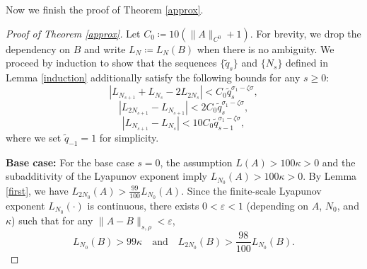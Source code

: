 \documentclass[reqno,12pt]{amsart}
\theoremstyle{plain}
\theoremstyle{definition}
\numberwithin{equation}{section}
\begin{document}
Now we finish the proof of Theorem \ref{approx}.
\begin{proof}[Proof of Theorem \ref{approx}]
Let $C_{0}\coloneq 10(\|A\|_{C^{0}}+1)$. For brevity, we drop the dependency on $B$ and write $L_{N}\coloneq L_{N}(B)$ when there is no ambiguity.
We proceed by induction to show that the sequences $\{\tilde{q}_{s}\}$ and $\{N_{s}\}$ defined in Lemma \ref{induction} additionally satisfy the following bounds for any $s\geqslant 0$:
\begin{equation}\label{Q1}
    |L_{N_{s+1}}+L_{N_{s}}-2L_{2N_{s}}|<C_{0}\tilde{q}_{s}^{\sigma_{1}-\zeta\sigma},
\end{equation}
\begin{equation}\label{Q2}
    |L_{2N_{s+1}}-L_{N_{s+1}}|<2C_{0}\tilde{q}_{s}^{\sigma_{1}-\zeta\sigma},
\end{equation}
\begin{equation}\label{Q3}
    |L_{N_{s+1}}-L_{N_{s}}|< 10C_{0}\tilde{q}_{s-1}^{\sigma_{1}-\zeta\sigma},
\end{equation}
where we set $\tilde{q}_{-1}=1$ for simplicity.

{\bf Base case: }For the base case $s=0$, the assumption $L(A)>100\kappa>0$ and the subadditivity of the Lyapunov exponent imply $L_{N_{0}}(A)>100\kappa>0$. By Lemma \ref{first}, we have $L_{2N_{0}}(A)>\frac{99}{100}L_{N_{0}}(A)$. Since the finite-scale Lyapunov exponent $L_{N_{0}}(\cdot)$ is continuous, there exists $0<\varepsilon<1$ (depending on $A$, $N_{0}$, and $\kappa$) such that for any $\|A-B\|_{s,\rho}<\varepsilon$,
\begin{equation}\label{aB}
    L_{N_{0}}(B)> 99\kappa \quad \text{and} \quad L_{2N_{0}}(B)>\frac{98}{100}L_{N_{0}}(B).
\end{equation}


\end{proof}
\end{document}

